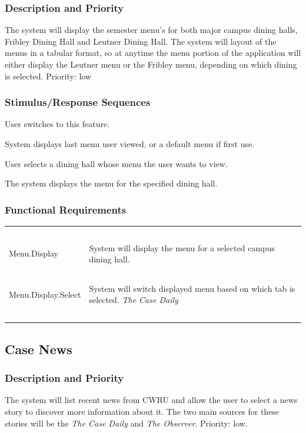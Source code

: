 \documentclass[pdftex,12pt,letter]{article}
\begin{document}
\subsubsection{Description and Priority}
The system will display the semester menu's for both major campus dining halls, Fribley Dining Hall and Leutner Dining Hall. The system will layout of the menus in a tabular format, so at anytime the menu portion of the application will either display the Leutner menu or the Fribley menu, depending on which dining is selected. Priority: low
\subsubsection{Stimulus/Response Sequences}
\begin{description}\itemsep1pt
\item[Stimulus:] User switches to this feature.
\item[Response:] System displays last menu user viewed, or a default menu if first use.
\item[Stimulus:] User selects a dining hall whose menu the user wants to view.
\item[Response:] The system displays the menu for the specified dining hall.
\end{description}
\subsubsection{Functional Requirements}
\begin{table}[!h]
\begin{tabularx}{\textwidth }[t]{|l Y|}
\hline
~&~\\
Menu.Display & System will display the menu for a selected campus dining hall.\\ 
~&~\\
Menu.Display.Select & System will switch displayed menu based on which tab is selected. \emph{The Case Daily}\\
~&~\\
\hline
\end{tabularx}
\end{table}
\FloatBarrier
\subsection{Case News}
\subsubsection{Description and Priority}
The system will list recent news from CWRU and allow the user to select a news story to discover more information about it. The two main sources for these stories will be the \emph{The Case Daily} and \emph{The Observer}. Priority: low.
\end{document}
